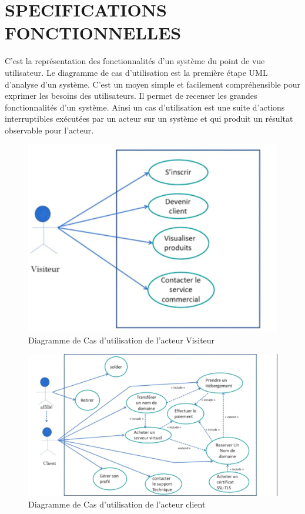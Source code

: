 \documentclass[a4paper, 12pt]{report}
\begin{document}
\section{SPECIFICATIONS FONCTIONNELLES}
\noindent C’est la représentation des fonctionnalités d’un système du point de vue utilisateur.
Le diagramme de cas d’utilisation est la première étape UML d’analyse d’un système. C’est un moyen simple et facilement compréhensible pour exprimer les besoins des utilisateurs. Il permet de recenser les grandes fonctionnalités d’un système.
Ainsi un cas d’utilisation est une suite d’actions interruptibles exécutées par un acteur sur un système et qui produit un résultat observable pour l’acteur.
\begin{figure}[H]
	\centering
	\includegraphics{img/cas-visiteur}
	\caption{Diagramme de Cas d’utilisation de l’acteur Visiteur}
	\label{Tux}
\end{figure}
\begin{figure}[H]
	\centering
	\includegraphics{img/cas-client}
	\caption{Diagramme de Cas d’utilisation de l’acteur client}
	\label{Tux}
\end{figure}
\end{document}
